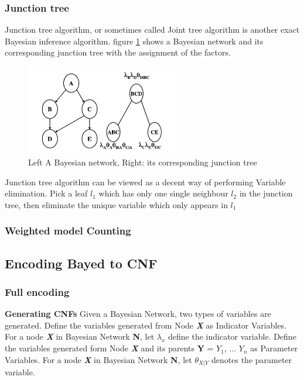         \subsubsection{Junction tree}
        Junction tree algorithm, or sometimes called Joint tree algorithm is another exact Bayesian inference algorithm. figure \ref{fig:bayesjunc} shows a Bayesian network and its corresponding junction tree with the assignment of the factors.
        \begin{figure}
            \centering
            \includegraphics[width = 0.6\textwidth]{pic/bayesandjunctree.png}
            \caption{Left A Bayesian network, Right: its corresponding junction tree}
            \label{fig:bayesjunc}
        \end{figure}
        Junction tree algorithm can be viewed as a decent way of performing Variable elimination. Pick a leaf $l_{1}$ which has only one single neighbour $l_{2}$ in the junction tree, then eliminate the unique variable which only appears in $l_{1}$
        \subsubsection{Weighted model Counting}
    
    \subsection{Encoding Bayed to CNF}
        \subsubsection{Full encoding}
            \textbf{Generating CNFs}
            \newline
            Given a Bayesian Network, two types of variables are generated.
            Define the variables generated from Node \textbf{\textit{X}} as Indicator Variables.
            For a node \textbf{\textit{X}} in Bayesian Network \textbf{N}, let $\lambda_x$ define the indicator variable. 
            Define the variables generated form Node \textbf{\textit{X}} and its parents \textbf{Y} = {$Y_{1}$, ... $Y_{n}$} as Parameter Variables.
            For a node \textbf{\textit{X}} in Bayesian Network \textbf{N}, let $\theta_{X|Y}$ denotes the parameter variable.\\
            
